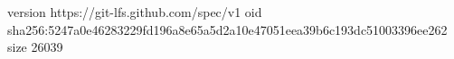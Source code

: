 version https://git-lfs.github.com/spec/v1
oid sha256:5247a0e46283229fd196a8e65a5d2a10e47051eea39b6c193dc51003396ee262
size 26039
